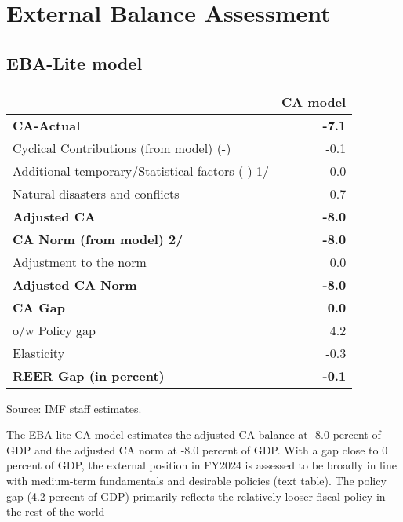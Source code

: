 \documentclass[12pt]{article}
\begin{document}
\newpage





\section{External Balance Assessment}
\subsection{EBA-Lite model}


\begin{table}[h!]
\centering
\renewcommand{\arraystretch}{1.3} %

\begin{tabular}{@{}l r@{}} %
\hline
 & \textbf{CA model} \\
\hline
\textbf{CA-Actual} & \textbf{-7.1} \\
\quad Cyclical Contributions (from model) (-) & -0.1 \\
\quad Additional temporary/Statistical factors (-) 1/ & 0.0 \\
\quad Natural disasters and conflicts & 0.7 \\
\textbf{Adjusted CA} & \textbf{-8.0} \\[6pt]

\textbf{CA Norm (from model) 2/} & \textbf{-8.0} \\
\quad Adjustment to the norm & 0.0 \\
\textbf{Adjusted CA Norm} & \textbf{-8.0} \\[6pt]

\textbf{CA Gap} & \textbf{0.0} \\
\quad o/w Policy gap & 4.2 \\[6pt]

Elasticity & -0.3 \\
\textbf{REER Gap (in percent)} & \textbf{-0.1} \\
\hline
\end{tabular}

\vspace{2pt}

\centering
\quad \quad \parbox{\linewidth}{\hspace{0pt}\footnotesize Source: IMF staff estimates.}

\end{table}
The EBA-lite CA model estimates the adjusted CA balance at -8.0 percent of GDP and the 
adjusted CA norm at -8.0 percent of GDP. With a gap close to 0 percent of GDP, the external position in 
FY2024 is assessed to be broadly in line with medium-term fundamentals and desirable policies (text table). 
The policy gap (4.2 percent of GDP) primarily reflects the relatively looser fiscal policy in the rest of the 
world
\end{document}
